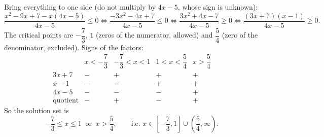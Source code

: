 Bring everything to one side (do not multiply by $4x-5$, whose sign is unknown):
\[
\dfrac{x^2-9x+7-x(4x-5)}{4x-5}\le0\iff\dfrac{-3x^2-4x+7}{4x-5}\le0\iff\dfrac{3x^2+4x-7}{4x-5}\ge0\iff\dfrac{(3x+7)(x-1)}{4x-5}\ge0 .
\]
The critical points are $-\dfrac{7}{3}$, $1$ (zeros of the numerator, allowed) and $\dfrac{5}{4}$ (zero of the denominator, excluded). Signs of the factors:
\[
\begin{array}{c|cccc}
 & x<-\dfrac{7}{3} & -\dfrac{7}{3}<x<1 & 1<x<\dfrac{5}{4} & x>\dfrac{5}{4}\\ \hline
3x+7 & - & + & + & +\\
x-1 & - & - & + & +\\
4x-5 & - & - & - & +\\ \hline
\text{quotient} & - & + & - & +
\end{array}
\]
So the solution set is
\[
\boxed{-\dfrac{7}{3}\le x\le1\ \text{ or }\ x>\dfrac{5}{4}},\qquad\text{i.e. } x\in\left[-\dfrac{7}{3},1\right]\cup\left(\dfrac{5}{4},\infty\right).
\]
